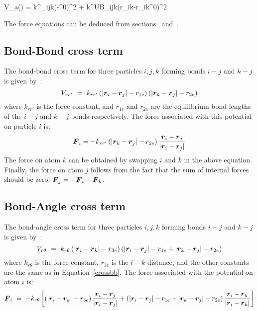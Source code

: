 \beq
V_a(\tijk) = \half k^{\theta}_{ijk}(\tijk-\tijk^0)^2 + \half k^{UB}_{ijk}(r_{ik}-r_{ik}^0)^2
\eeq

The force equations can be deduced from sections~
and~.

\subsection{Bond-Bond cross term}
\label{subsec:bondbondcross}
The bond-bond cross term for three particles $i, j, k$ forming bonds
$i-j$ and $k-j$ is given by~\cite{Lawrence2003b}:
\begin{equation}
V_{rr'} ~=~ k_{rr'} \left(\left|\mbox{\boldmath ${r}$}_{i}-\mbox{\boldmath ${r}$}_j\right|-r_{1e}\right) \left(\left|\mbox{\boldmath ${r}$}_{k}-\mbox{\boldmath ${r}$}_j\right|-r_{2e}\right)
\label{crossbb}
\end{equation}
where $k_{rr'}$ is the force constant, and $r_{1e}$ and $r_{2e}$ are the
equilibrium bond lengths of the $i-j$ and $k-j$ bonds respectively. The force
associated with this potential on particle $i$ is:
\begin{equation}
\mbox{\boldmath ${F}$}_{i} = -k_{rr'}\left(\left|\mbox{\boldmath ${r}$}_{k}-\mbox{\boldmath ${r}$}_j\right|-r_{2e}\right)\frac{\mbox{\boldmath ${r}$}_i-\mbox{\boldmath ${r}$}_j}{\left|\mbox{\boldmath ${r}$}_{i}-\mbox{\boldmath ${r}$}_j\right|}
\end{equation}
The force on atom $k$ can be obtained by swapping $i$ and $k$ in the above
equation. Finally, the force on atom $j$ follows from the fact that the sum
of internal forces should be zero: $\mbox{\boldmath ${F}$}_j = -\mbox{\boldmath ${F}$}_i-\mbox{\boldmath ${F}$}_k$.

\subsection{Bond-Angle cross term}
\label{subsec:bondanglecross}
The bond-angle cross term for three particles $i, j, k$ forming bonds
$i-j$ and $k-j$ is given by~\cite{Lawrence2003b}:
\begin{equation}
V_{r\theta} ~=~ k_{r\theta} \left(\left|\mbox{\boldmath ${r}$}_{i}-\mbox{\boldmath ${r}$}_k\right|-r_{3e} \right) \left(\left|\mbox{\boldmath ${r}$}_{i}-\mbox{\boldmath ${r}$}_j\right|-r_{1e} + \left|\mbox{\boldmath ${r}$}_{k}-\mbox{\boldmath ${r}$}_j\right|-r_{2e}\right)
\end{equation}
where $k_{r\theta}$ is the force constant, $r_{3e}$ is the $i-k$ distance,
and the other constants are the same as in Equation~\ref{crossbb}. The force
associated with the potential on atom $i$ is:
\begin{equation}
\mbox{\boldmath ${F}$}_{i} ~=~ -k_{r\theta}\left[\left(\left|\mbox{\boldmath ${r}$}_{i}-\mbox{\boldmath ${r}$}_{k}\right|-r_{3e}\right)\frac{\mbox{\boldmath ${r}$}_i-\mbox{\boldmath ${r}$}_j}{\left|\mbox{\boldmath ${r}$}_{i}-\mbox{\boldmath ${r}$}_j\right|} \\
+ \left(\left|\mbox{\boldmath ${r}$}_{i}-\mbox{\boldmath ${r}$}_j\right|-r_{1e} + \left|\mbox{\boldmath ${r}$}_{k}-\mbox{\boldmath ${r}$}_j\right|-r_{2e}\right)\frac{\mbox{\boldmath ${r}$}_i-\mbox{\boldmath ${r}$}_k}{\left|\mbox{\boldmath ${r}$}_{i}-\mbox{\boldmath ${r}$}_k\right|}\right]
\end{equation}


